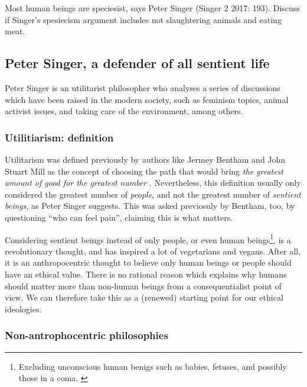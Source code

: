 \documentclass{myassignment}
\newcommand{\q}[1]{``#1''}
\begin{document}
	\begin{problem}
		Most human beings are speciesist, says Peter Singer (Singer 2 2017: 193). Discuss if Singer’s spesiecism argument includes not slaughtering animals and eating meat.%
	\end{problem}%
	\begin{answer}
		\section*{Peter Singer, a defender of all sentient life}%
		
		Peter Singer is an utilitarist philosopher who analyses a series of discussions which have been raised in the modern society, such as feminism topics, animal activist issues, and taking care of the environment, among others.

		\subsubsection*{Utilitiarism: definition}%
		
		Utilitarism was defined previously by authors like Jermey Bentham and John Stuart Mill as the concept of choosing the path that would bring \emph{the greatest amount of good for the greatest number} \autocite{definitionutilitarism}. Nevertheless, this definition usually only considered the greatest number of \emph{people}, and not the greatest number of \emph{sentient beings}, as Peter Singer suggests. This was asked previosuly by Bentham, too, by questioning \q{who can feel pain}, claiming this is what matters.

		Considering sentient beings instead of only people, or even human beings\footnote{Excluding unconscious human benigs such as babies, fetuses, and possibly those in a coma. \autocite{singerpracticalethics}}, is a revolutionary thought, and has inspired a lot of vegetarians and vegans. After all, it is an anthropocentric thought to believe only human beings or people should have an ethical value. There is no rational reason which explains why humans should matter more than non-human beings from a consequentialist point of view. We can therefore take this as a (renewed) starting point for our ethical ideologies.

		\subsubsection*{Non-antrophocentric philosophies}%
		

\end{answer}
\end{document}
